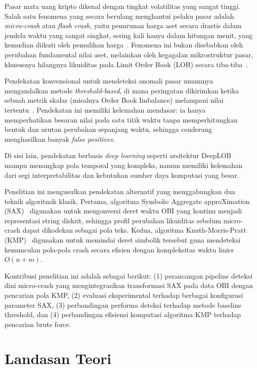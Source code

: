 \documentclass[conference]{IEEEtran}
\begin{document}
Pasar mata uang kripto dikenal dengan tingkat volatilitas yang sangat tinggi. Salah satu fenomena yang secara berulang menghantui pelaku pasar adalah \textit{micro-crash} atau \textit{flash crash}, yaitu penurunan harga aset secara drastis dalam jendela waktu yang sangat singkat, sering kali hanya dalam hitungan menit, yang kemudian diikuti oleh pemulihan harga~\cite{easley2011}. Fenomena ini bukan disebabkan oleh perubahan fundamental nilai aset, melainkan oleh kegagalan mikrostruktur pasar, khususnya hilangnya likuiditas pada Limit Order Book (LOB) secara tiba-tiba~\cite{foucault2005}.

Pendekatan konvensional untuk mendeteksi anomali pasar umumnya mengandalkan metode \textit{threshold-based}, di mana peringatan dikirimkan ketika sebuah metrik skalar (misalnya Order Book Imbalance) melampaui nilai tertentu~\cite{cont2001}. Pendekatan ini memiliki kelemahan mendasar: ia hanya memperhatikan besaran nilai pada satu titik waktu tanpa memperhitungkan bentuk dan urutan perubahan sepanjang waktu, sehingga cenderung menghasilkan banyak \textit{false positives}.

Di sisi lain, pendekatan berbasis \textit{deep learning} seperti arsitektur DeepLOB~\cite{zhang2023} mampu menangkap pola temporal yang kompleks, namun memiliki kelemahan dari segi interpretabilitas dan kebutuhan sumber daya komputasi yang besar.

Penelitian ini mengusulkan pendekatan alternatif yang menggabungkan dua teknik algoritmik klasik. Pertama, algoritma Symbolic Aggregate approXimation (SAX)~\cite{lin2007} digunakan untuk mengonversi deret waktu OBI yang kontinu menjadi representasi string diskrit, sehingga profil perubahan likuiditas sebelum micro-crash dapat dikodekan sebagai pola teks. Kedua, algoritma Knuth-Morris-Pratt (KMP)~\cite{knuth1977} digunakan untuk memindai deret simbolik tersebut guna mendeteksi kemunculan pola-pola crash secara efisien dengan kompleksitas waktu linier $O(n+m)$.

Kontribusi penelitian ini adalah sebagai berikut: (1) perancangan pipeline deteksi dini micro-crash yang mengintegrasikan transformasi SAX pada data OBI dengan pencarian pola KMP, (2) evaluasi eksperimental terhadap berbagai konfigurasi parameter SAX, (3) perbandingan performa deteksi terhadap metode baseline threshold, dan (4) perbandingan efisiensi komputasi algoritma KMP terhadap pencarian brute force.

\section{Landasan Teori}
\end{document}
